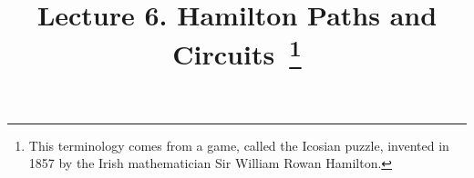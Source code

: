 \documentclass[aspectratio=169]{beamer}
\begin{document}
 

\newcommand{\Cov}{\mathrm{Cov}}
\newcommand{\Var}{\mathrm{Var}}
\newcommand{\brho}{\boldsymbol{\rho}}
\newcommand{\bSigma}{\boldsymbol{\Sigma}}
\newcommand{\btheta}{\boldsymbol{\theta}}
\newcommand{\bbeta}{\boldsymbol{\beta}}
\newcommand{\bmu}{\boldsymbol{\mu}}
\newcommand{\bW}{\mathbf{W}}
\newcommand{\one}{\mathbf{1}}
\newcommand{\bH}{\mathbf{H}}
\newcommand{\by}{\mathbf{y}}
\newcommand{\bolde}{\mathbf{e}}
\newcommand{\bx}{\mathbf{x}}

\newcommand{\cpp}[1]{\texttt{#1}}

\providecommand{\abs}[1]{\lvert#1\rvert}
\providecommand{\norm}[1]{\lVert#1\rVert}
\providecommand{\Blue}[1]{\textcolor{blue}{#1}}
\providecommand{\Red}[1]{\textcolor{red}{#1}}  
\providecommand{\Purple}[1]{\textcolor{purple}{#1}} %
\newcommand{\celsius}{\ensuremath{^\circ}C}
\newcommand\thfore{\mathord{\therefore}\,}

\title{Lecture 6. Hamilton Paths and Circuits~\footnote{
  This terminology comes from a game, called the Icosian puzzle, invented in 1857 by the
Irish mathematician Sir William Rowan Hamilton.}
}

\date{ }

\frame[plain]{\titlepage}
\end{document}
